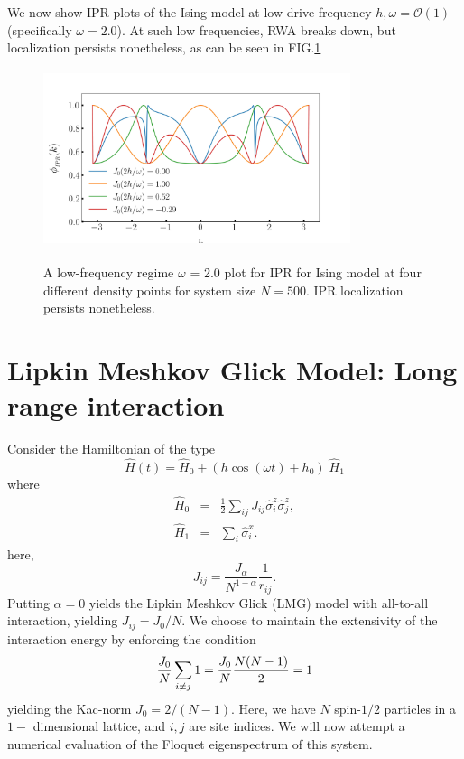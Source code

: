 \documentclass[%
 reprint,
 amsmath,amssymb,
 aps,
]{revtex4-2}
\begin{document}
We now show IPR plots of the Ising model at low drive frequency $h, \omega = \mathcal{O}(1)$ (specifically $\omega=2.0$). At such low frequencies, RWA breaks down, but localization persists nonetheless, as can be seen in FIG.\ref{fig:ipr_ising_lowfr}
\begin{figure}[]
	\centering
	\includegraphics[height = 5.2cm, width =9cm]{low_frq_exactN500_ipr.jpeg}
	\label{fig:ipr_ising_lowfr}
	\caption{A low-frequency regime $\omega$ = 2.0 plot for IPR for Ising model at four different density points for system size $N = 500$. IPR localization persists nonetheless.}
\end{figure}

\section{\label{sec:level3}Lipkin Meshkov Glick Model: Long range interaction}
Consider the Hamiltonian of the type
\begin{equation*}
	\hat{H}(t) = \hat{H}_0 + \left(h \cos{(\omega t)} + h_0\right)\; \hat{H}_1
\end{equation*}
where
\begin{eqnarray}
	\hat{H}_0 &=& \frac12 \sum_{ij}J_{ij}\hat{\sigma}^z_i\hat{\sigma}^z_j,\\
	\hat{H}_1 &=& \sum_i\hat{\sigma}^x_i.
\end{eqnarray}
here,
\begin{equation*}
	J_{ij} =\frac{J_\alpha}{N^{1-\alpha}}\frac{1}{r_{ij}}.
\end{equation*}
Putting  $\alpha = 0$ yields the Lipkin Meshkov Glick (LMG) model with all-to-all interaction, yielding $J_{ij} = J_0/N$. We choose to maintain the extensivity of the interaction energy by enforcing the condition
\begin{equation*}
	\frac{J_0}{N} \sum_{i\neq j}1=\frac{J_0}{N}\frac{N(N-1)}{2}=1\\
\end{equation*}
yielding the Kac-norm $J_0=2/(N-1)$. Here, we have $N$ spin-$1/2$ particles in a $1-$ dimensional lattice, and $i,j$ are site indices. We will now attempt a numerical evaluation of
the Floquet eigenspectrum of this system.
\end{document}
